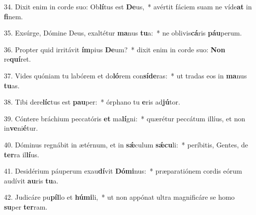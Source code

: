 34. Dixit enim in corde suo: Ob\textbf{lí}tus est \textbf{De}us,~*  avértit fáciem suam ne víde\textbf{at} in \textbf{fi}nem.\

35. Exsúrge, Dómine Deus, exaltétur \textbf{ma}nus \textbf{tu}a:~*  ne oblivis\textbf{cá}ris \textbf{páu}perum.\

36. Propter quid irritávit \textbf{ím}pius \textbf{De}um?~*  dixit enim in corde suo: \textbf{Non} re\textbf{quí}ret.\

37. Vides quóniam tu labórem et do\textbf{ló}rem con\textbf{sí}\textbf{de}ras:~*  ut tradas eos in \textbf{ma}nus \textbf{tu}as.\

38. Tibi dere\textbf{líc}tus est \textbf{pau}per:~*  órphano tu \textbf{e}ris ad\textbf{jú}tor.\

39. Cóntere bráchium peccatóris \textbf{et} ma\textbf{lí}gni:~*  quærétur peccátum illíus, et non in\textbf{ve}ni\textbf{é}tur.\

40. Dóminus regnábit in ætérnum, et in \textbf{sǽ}culum \textbf{sǽ}\textbf{cu}li:~*  períbitis, Gentes, de \textbf{ter}ra il\textbf{lí}us.\

41. Desidérium páuperum exau\textbf{dí}vit \textbf{Dó}\textbf{mi}nus:~*  præparatiónem cordis eórum audívit \textbf{au}ris \textbf{tu}a.\

42. Judicáre pu\textbf{píl}lo et \textbf{hú}\textbf{mi}li,~*  ut non appónat ultra magnificáre se homo \textbf{su}per \textbf{ter}ram.\


